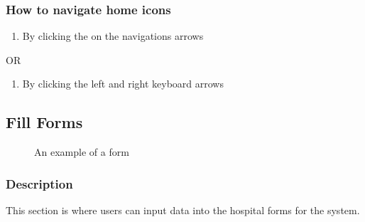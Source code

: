 \documentclass[14pt, a4paper]{article}
\begin{document}
	\subsubsection{How to navigate home icons}
		\begin{enumerate}
			\item By clicking the on the navigations arrows
		\end{enumerate}
		\begin{center} OR \end{center}
		\begin{enumerate}
			\item By clicking the left and right keyboard arrows
		\end{enumerate}
\subsection{Fill Forms}
	\begin{figure}[H]
		\centerline{}
		\caption{An example of a form}
  		\label{fig:forms1}
	\end{figure}
	\subsubsection{Description} This section is where users can input data into the hospital forms for the system. 
\end{document}
